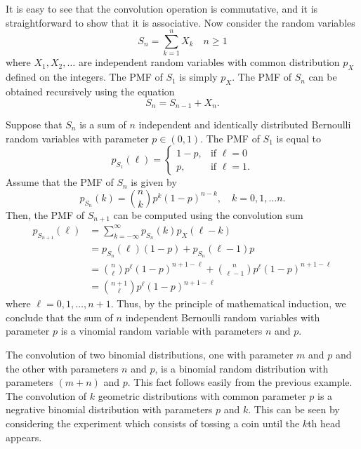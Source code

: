 It is easy to see that the convolution operation is commutative, and it is straightforward to show that it is associative.
Now consider the random variables
\begin{equation*}
S_n = \sum_{k=1}^n X_k \quad n \geq 1
\end{equation*}
where $X_1, X_2, \ldots$ are independent random variables with common distribution $p_X$ defined on the integers.
The PMF of $S_1$ is simply $p_X$.
The PMF of $S_n$ can be obtained recursively using the equation
\begin{equation*}
S_n = S_{n-1} + X_n .
\end{equation*}

\begin{example}
Suppose that $S_n$ is a sum of $n$ independent and identically distributed Bernoulli random variables with parameter $p \in (0,1)$.
The PMF of $S_1$ is equal to
\begin{equation*}
p_{S_1} (\ell) = \begin{cases}
1 - p, & \text{if }\ell = 0 \\p, & \text{if }\ell = 1 .
\end{cases}
\end{equation*}
Assume that the PMF of $S_n$ is given by
\begin{equation*}
p_{S_n} (k)
= \binom{n}{k} p^k (1-p)^{n-k} ,
\quad k = 0, 1, \ldots n.
\end{equation*}
Then, the PMF of $S_{n+1}$ can be computed using the convolution sum
\begin{equation*}
\begin{split}
p_{S_{n+1}} (\ell) &= \sum_{k = - \infty}^{\infty} p_{S_n}(k) p_X(\ell-k) \\
&= p_{S_n}(\ell) (1-p) + p_{S_n}(\ell-1) p \\
&= \binom{n}{\ell} p^{\ell} (1-p)^{n+1-\ell} + \binom{n}{\ell-1} p^{\ell} (1-p)^{n+1-\ell} \\
&= \binom{n+1}{\ell} p^{\ell} (1-p)^{n+1-\ell}
\end{split}
\end{equation*}
where $\ell = 0, 1, \ldots, n+1$.
Thus, by the principle of mathematical induction, we conclude that the sum of $n$ independent Bernoulli random variables with parameter $p$ is a vinomial random variable with parameters $n$ and $p$.
\end{example}

The convolution of two binomial distributions, one with parameter $m$ and $p$ and the other with parameters $n$ and $p$, is a binomial random distribution with parameters $(m+n)$ and $p$.
This fact follows easily from the previous example.
The convolution of $k$ geometric distributions with common parameter $p$ is a negrative binomial distribution with parameters $p$ and $k$.
This can be seen by considering the experiment which consists of tossing a coin until the $k$th head appears.




